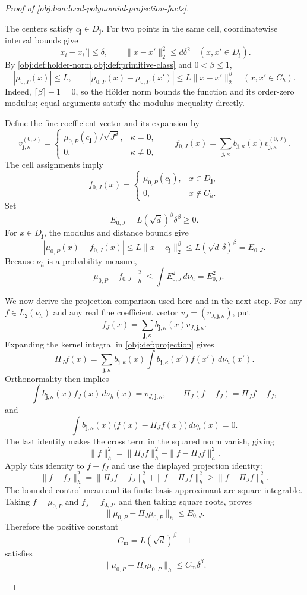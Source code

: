 \documentclass[11pt]{article}
\begin{document}
\begin{proof}[Proof of \cref{obj:lem:local-polynomial-projection-facts}]
\begin{enumerate}
The centers satisfy \(c_{\mathbf j}\in D_{\mathbf j}\).
For two points in the same cell, coordinatewise interval bounds give
\[
|x_i-x_i'|\le\delta,
\qquad
\|x-x'\|_2^2\le d\delta^2
\quad(x,x'\in D_{\mathbf j}).
\]
By \cref{obj:def:holder-norm,obj:def:primitive-class} and
\(0<\beta\le1\),
\[
|\mu_{0,P}(x)|\le L,
\qquad
|\mu_{0,P}(x)-\mu_{0,P}(x')|
 \le L\|x-x'\|_2^\beta
\quad(x,x'\in C_h).
\]
Indeed, \(\lceil\beta\rceil-1=0\), so the Hölder norm bounds the
function and its order-zero modulus; equal arguments satisfy the modulus
inequality directly.

Define the fine coefficient vector and its expansion by
\[
v^{(0,J)}_{\mathbf j,\kappa}=
\begin{cases}
\mu_{0,P}(c_{\mathbf j})/\sqrt{J^d},&\kappa=\mathbf0,\\
0,&\kappa\ne\mathbf0,
\end{cases}
\qquad
f_{0,J}(x)=
 \sum_{\mathbf j,\kappa}
 b_{\mathbf j,\kappa}(x)v^{(0,J)}_{\mathbf j,\kappa}.
\]
The cell assignments imply
\[
f_{0,J}(x)=
\begin{cases}
\mu_{0,P}(c_{\mathbf j}),&x\in D_{\mathbf j},\\
0,&x\notin C_h.
\end{cases}
\]
Set
\[
E_{0,J}=L(\sqrt d)^\beta\delta^\beta\ge0.
\]
For \(x\in D_{\mathbf j}\), the modulus and distance bounds give
\[
|\mu_{0,P}(x)-f_{0,J}(x)|
 \le L\|x-c_{\mathbf j}\|_2^\beta
 \le L(\sqrt d\,\delta)^\beta
 =E_{0,J}.
\]
Because \(\nu_h\) is a probability measure,
\[
\|\mu_{0,P}-f_{0,J}\|_h^2
 \le\int E_{0,J}^2\,d\nu_h=E_{0,J}^2.
\]

We now derive the projection comparison used here and in the next step.
For any \(f\in L_2(\nu_h)\) and any real fine coefficient vector
\(v_J=(v_{J,\mathbf j,\kappa})\), put
\[
f_J(x)=\sum_{\mathbf j,\kappa}
 b_{\mathbf j,\kappa}(x)v_{J,\mathbf j,\kappa}.
\]
Expanding the kernel integral in \cref{obj:def:projection} gives
\[
\Pi_Jf(x)=
 \sum_{\mathbf j,\kappa}b_{\mathbf j,\kappa}(x)
 \int b_{\mathbf j,\kappa}(x')f(x')\,d\nu_h(x').
\]
Orthonormality then implies
\[
\int b_{\mathbf j,\kappa}(x)f_J(x)\,d\nu_h(x)
 =v_{J,\mathbf j,\kappa},
\qquad
\Pi_J(f-f_J)=\Pi_Jf-f_J,
\]
and
\[
\int b_{\mathbf j,\kappa}(x)
       \bigl(f(x)-\Pi_Jf(x)\bigr)\,d\nu_h(x)=0.
\]
The last identity makes the cross term in the squared norm vanish, giving
\[
\|f\|_h^2=\|\Pi_Jf\|_h^2+\|f-\Pi_Jf\|_h^2.
\]
Apply this identity to \(f-f_J\) and use the displayed projection identity:
\[
\|f-f_J\|_h^2
 =\|\Pi_Jf-f_J\|_h^2+\|f-\Pi_Jf\|_h^2
 \ge\|f-\Pi_Jf\|_h^2.
\]
The bounded control mean and its finite-basis approximant are square
integrable. Taking \(f=\mu_{0,P}\) and \(f_J=f_{0,J}\), and then taking
square roots, proves
\[
\|\mu_{0,P}-\Pi_J\mu_{0,P}\|_h
 \le E_{0,J}.
\]
Therefore the positive constant
\[
C_{\mathrm m}=L(\sqrt d)^\beta+1
\]
satisfies
\[
\|\mu_{0,P}-\Pi_J\mu_{0,P}\|_h
 \le C_{\mathrm m}\delta^\beta.
\]


\end{enumerate}
\end{proof}
\end{document}
